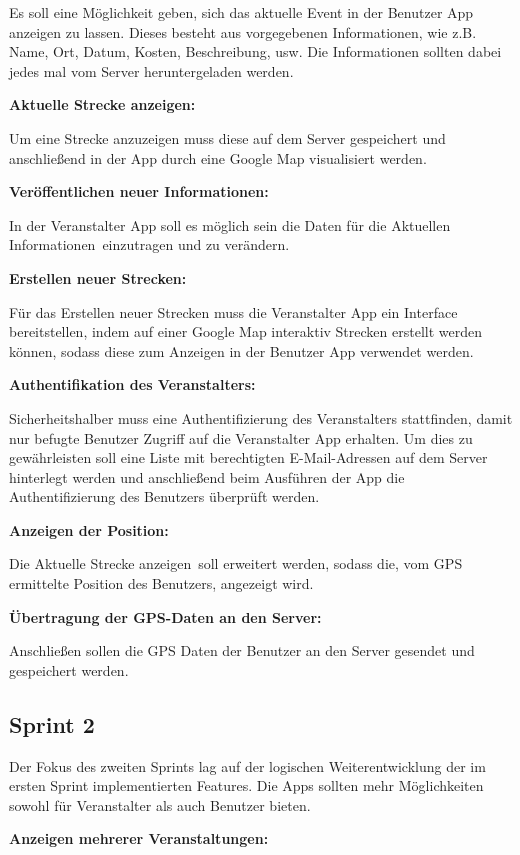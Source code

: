 \documentclass[a4paper, titlepage]{scrartcl}
\begin{document}
Es soll eine Möglichkeit geben, sich das aktuelle Event in der Benutzer App anzeigen zu lassen. Dieses besteht aus vorgegebenen Informationen, wie z.B. Name, Ort, Datum, Kosten, Beschreibung, usw. Die Informationen sollten dabei jedes mal vom Server heruntergeladen werden.

\textbf{Aktuelle Strecke anzeigen:}

Um eine Strecke anzuzeigen muss diese auf dem Server gespeichert und anschließend in der App durch eine Google Map visualisiert werden.

\textbf{Veröffentlichen neuer Informationen:}

In der Veranstalter App soll es möglich sein die Daten für die \glqq Aktuellen Informationen\grqq\ einzutragen und zu verändern.

\textbf{Erstellen neuer Strecken:}

Für das Erstellen neuer Strecken muss die Veranstalter App ein Interface bereitstellen, indem auf einer Google Map interaktiv Strecken erstellt werden können, sodass diese zum Anzeigen in der Benutzer App verwendet werden.

\textbf{Authentifikation des Veranstalters:}

Sicherheitshalber muss eine Authentifizierung des Veranstalters stattfinden, damit nur befugte Benutzer Zugriff auf die Veranstalter App erhalten. Um dies zu gewährleisten soll eine Liste mit berechtigten E-Mail-Adressen auf dem Server hinterlegt werden und anschließend beim Ausführen der App die Authentifizierung des Benutzers überprüft werden.

\textbf{Anzeigen der Position:}

Die \glqq Aktuelle Strecke anzeigen\grqq\ soll erweitert werden, sodass die, vom GPS ermittelte Position des Benutzers, angezeigt wird.

\textbf{Übertragung der GPS-Daten an den Server:}

Anschließen sollen die GPS Daten der Benutzer an den Server gesendet und gespeichert werden.




\subsection{Sprint 2}
Der Fokus des zweiten Sprints lag auf der logischen Weiterentwicklung der im ersten Sprint implementierten Features. Die Apps sollten mehr Möglichkeiten sowohl für Veranstalter als auch Benutzer bieten.

\textbf{Anzeigen mehrerer Veranstaltungen:}
\end{document}
